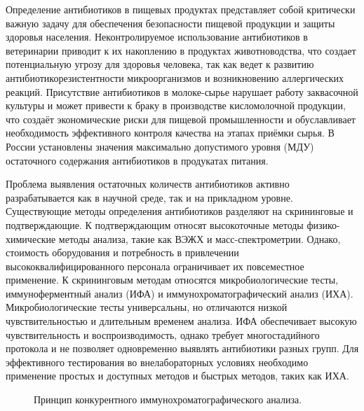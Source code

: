
{\actuality} 

Определение антибиотиков в пищевых продуктах представляет собой критически важную задачу для обеспечения безопасности пищевой продукции и защиты здоровья населения. Неконтролируемое использование антибиотиков в ветеринарии приводит к их накоплению в продуктах животноводства, что создает потенциальную угрозу для здоровья человека, так как ведет к развитию антибиотикорезистентности микроорганизмов и возникновению аллергических реакций. Присутствие антибиотиков в молоке-сырье нарушает работу заквасочной культуры и может привести к браку в производстве кисломолочной продукции, что создаёт экономические риски для пищевой промышленности и обуславливает необходимость эффективного контроля качества на этапах приёмки сырья. В России установлены значения максимально допустимого уровня (МДУ) остаточного содержания  антибиотиков в продукатах питания. %

Проблема выявления остаточных количеств антибиотиков активно разрабатывается как в научной среде, так и на прикладном уровне. Существующие методы определения антибиотиков разделяют на скрининговые и подтверждающие. К подтверждающим относят высокоточные методы физико-химические методы анализа, такие как ВЭЖХ и масс-спектрометрии. Однако, стоимость оборудования и потребность в привлечении высококвалифицированного персонала ограничивает их повсеместное применение. К скрининговым методам относятся микробиологические тесты, иммуноферментный анализ (ИФА) и иммунохроматографический анализ (ИХА). Микробиологические тесты универсальны, но отличаются низкой чувствительностью и длительным временем анализа. ИФА обеспечивает высокую чувствительность и воспроизводимость, однако требует многостадийного протокола и не позволяет одновременно выявлять антибиотики разных групп. Для эффективного тестирования во внелабораторных условиях необходимо применение простых и доступных методов и быстрых методов, таких как ИХА. 

\begin{figure}[ht]
    \caption{Принцип конкурентного иммунохроматографического анализа.}\label{fig:с_ica_principle}
\end{figure}

